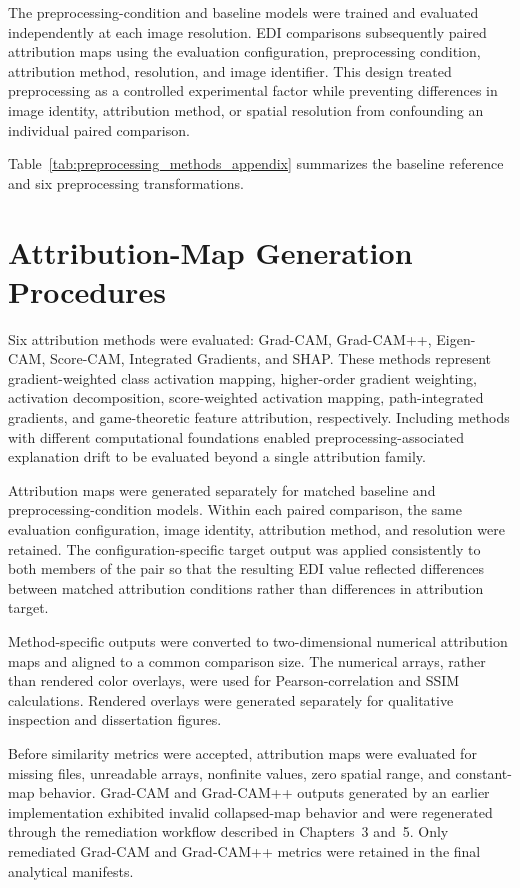 The preprocessing-condition and baseline models were trained and evaluated independently at each image resolution. EDI comparisons subsequently paired attribution maps using the evaluation configuration, preprocessing condition, attribution method, resolution, and image identifier. This design treated preprocessing as a controlled experimental factor while preventing differences in image identity, attribution method, or spatial resolution from confounding an individual paired comparison.

Table~\ref{tab:preprocessing_methods_appendix} summarizes the baseline reference and six preprocessing transformations.






\section{Attribution-Map Generation Procedures}

Six attribution methods were evaluated: Grad-CAM, Grad-CAM++, Eigen-CAM, Score-CAM, Integrated Gradients, and SHAP. These methods represent gradient-weighted class activation mapping, higher-order gradient weighting, activation decomposition, score-weighted activation mapping, path-integrated gradients, and game-theoretic feature attribution, respectively. Including methods with different computational foundations enabled preprocessing-associated explanation drift to be evaluated beyond a single attribution family.

Attribution maps were generated separately for matched baseline and preprocessing-condition models. Within each paired comparison, the same evaluation configuration, image identity, attribution method, and resolution were retained. The configuration-specific target output was applied consistently to both members of the pair so that the resulting EDI value reflected differences between matched attribution conditions rather than differences in attribution target.

Method-specific outputs were converted to two-dimensional numerical attribution maps and aligned to a common comparison size. The numerical arrays, rather than rendered color overlays, were used for Pearson-correlation and SSIM calculations. Rendered overlays were generated separately for qualitative inspection and dissertation figures.

Before similarity metrics were accepted, attribution maps were evaluated for missing files, unreadable arrays, nonfinite values, zero spatial range, and constant-map behavior. Grad-CAM and Grad-CAM++ outputs generated by an earlier implementation exhibited invalid collapsed-map behavior and were regenerated through the remediation workflow described in Chapters~3 and~5. Only remediated Grad-CAM and Grad-CAM++ metrics were retained in the final analytical manifests.

